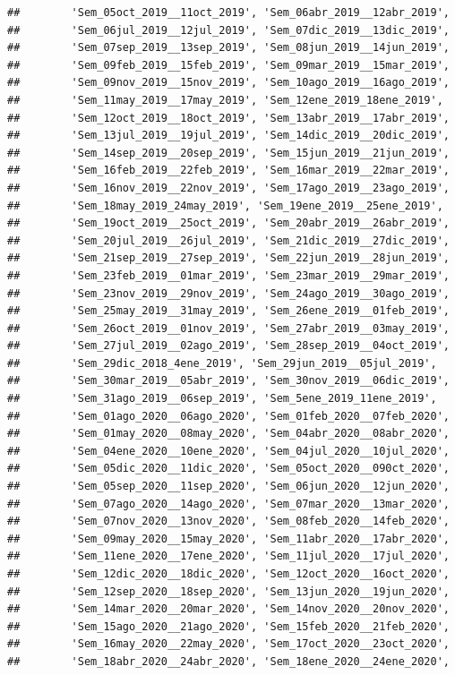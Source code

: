 \documentclass[
]{book}
\begin{document}
\begin{verbatim}
##        'Sem_05oct_2019__11oct_2019', 'Sem_06abr_2019__12abr_2019',
##        'Sem_06jul_2019__12jul_2019', 'Sem_07dic_2019__13dic_2019',
##        'Sem_07sep_2019__13sep_2019', 'Sem_08jun_2019__14jun_2019',
##        'Sem_09feb_2019__15feb_2019', 'Sem_09mar_2019__15mar_2019',
##        'Sem_09nov_2019__15nov_2019', 'Sem_10ago_2019__16ago_2019',
##        'Sem_11may_2019__17may_2019', 'Sem_12ene_2019_18ene_2019',
##        'Sem_12oct_2019__18oct_2019', 'Sem_13abr_2019__17abr_2019',
##        'Sem_13jul_2019__19jul_2019', 'Sem_14dic_2019__20dic_2019',
##        'Sem_14sep_2019__20sep_2019', 'Sem_15jun_2019__21jun_2019',
##        'Sem_16feb_2019__22feb_2019', 'Sem_16mar_2019__22mar_2019',
##        'Sem_16nov_2019__22nov_2019', 'Sem_17ago_2019__23ago_2019',
##        'Sem_18may_2019_24may_2019', 'Sem_19ene_2019__25ene_2019',
##        'Sem_19oct_2019__25oct_2019', 'Sem_20abr_2019__26abr_2019',
##        'Sem_20jul_2019__26jul_2019', 'Sem_21dic_2019__27dic_2019',
##        'Sem_21sep_2019__27sep_2019', 'Sem_22jun_2019__28jun_2019',
##        'Sem_23feb_2019__01mar_2019', 'Sem_23mar_2019__29mar_2019',
##        'Sem_23nov_2019__29nov_2019', 'Sem_24ago_2019__30ago_2019',
##        'Sem_25may_2019__31may_2019', 'Sem_26ene_2019__01feb_2019',
##        'Sem_26oct_2019__01nov_2019', 'Sem_27abr_2019__03may_2019',
##        'Sem_27jul_2019__02ago_2019', 'Sem_28sep_2019__04oct_2019',
##        'Sem_29dic_2018_4ene_2019', 'Sem_29jun_2019__05jul_2019',
##        'Sem_30mar_2019__05abr_2019', 'Sem_30nov_2019__06dic_2019',
##        'Sem_31ago_2019__06sep_2019', 'Sem_5ene_2019_11ene_2019',
##        'Sem_01ago_2020__06ago_2020', 'Sem_01feb_2020__07feb_2020',
##        'Sem_01may_2020__08may_2020', 'Sem_04abr_2020__08abr_2020',
##        'Sem_04ene_2020__10ene_2020', 'Sem_04jul_2020__10jul_2020',
##        'Sem_05dic_2020__11dic_2020', 'Sem_05oct_2020__090ct_2020',
##        'Sem_05sep_2020__11sep_2020', 'Sem_06jun_2020__12jun_2020',
##        'Sem_07ago_2020__14ago_2020', 'Sem_07mar_2020__13mar_2020',
##        'Sem_07nov_2020__13nov_2020', 'Sem_08feb_2020__14feb_2020',
##        'Sem_09may_2020__15may_2020', 'Sem_11abr_2020__17abr_2020',
##        'Sem_11ene_2020__17ene_2020', 'Sem_11jul_2020__17jul_2020',
##        'Sem_12dic_2020__18dic_2020', 'Sem_12oct_2020__16oct_2020',
##        'Sem_12sep_2020__18sep_2020', 'Sem_13jun_2020__19jun_2020',
##        'Sem_14mar_2020__20mar_2020', 'Sem_14nov_2020__20nov_2020',
##        'Sem_15ago_2020__21ago_2020', 'Sem_15feb_2020__21feb_2020',
##        'Sem_16may_2020__22may_2020', 'Sem_17oct_2020__23oct_2020',
##        'Sem_18abr_2020__24abr_2020', 'Sem_18ene_2020__24ene_2020',

\end{verbatim}
\end{document}
